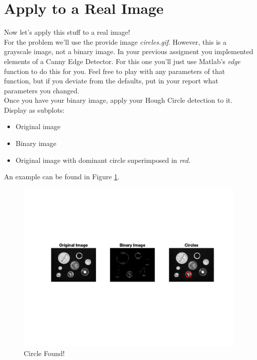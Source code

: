 \documentclass[12pt]{article}
\begin{document}
\newpage
\section{Apply to a Real Image}
Now let's apply this stuff to a real image!\\

\noindent
For the problem we'll use the provide image \emph{circles.gif}.  However, this is a grayscale image, not a binary image.  In your previous assigment you implemented elements of a Canny Edge Detector.  For this one you'll just use Matlab's \emph{edge} function to do this for you.  Feel free to play with any parameters of that function, but if you deviate from the defaults, put in your report what parameters you changed.\\

\noindent
Once you have your binary image, apply your Hough Circle detection to it.   Display as subplots:
\begin{itemize}
\item Original image
\item Binary image
\item Original image with dominant circle superimposed in \emph{red}.
\end{itemize}

\noindent
An example can be found in Figure \ref{fig4}.

\begin{figure}[H]
\begin{center}
\includegraphics[width=\textwidth]{part5.png}
\caption{Circle Found!}
\label{fig4}
\end{center}
\end{figure}
\end{document}
